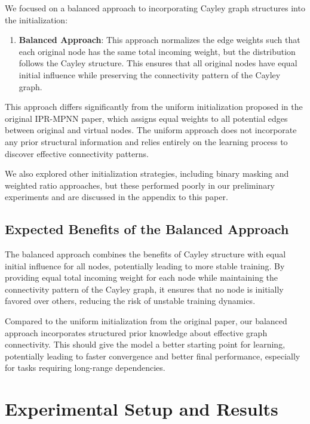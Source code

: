 \documentclass[11pt,a4paper]{article}
\begin{document}
We focused on a balanced approach to incorporating Cayley graph structures into the initialization:

\begin{enumerate}
    \item \textbf{Balanced Approach}: This approach normalizes the edge weights such that each original node has the same total incoming weight, but the distribution follows the Cayley structure. This ensures that all original nodes have equal initial influence while preserving the connectivity pattern of the Cayley graph.
\end{enumerate}

This approach differs significantly from the uniform initialization proposed in the original IPR-MPNN paper, which assigns equal weights to all potential edges between original and virtual nodes. The uniform approach does not incorporate any prior structural information and relies entirely on the learning process to discover effective connectivity patterns.

We also explored other initialization strategies, including binary masking and weighted ratio approaches, but these performed poorly in our preliminary experiments and are discussed in the appendix to this paper.

\subsection{Expected Benefits of the Balanced Approach}

The balanced approach combines the benefits of Cayley structure with equal initial influence for all nodes, potentially leading to more stable training. By providing equal total incoming weight for each node while maintaining the connectivity pattern of the Cayley graph, it ensures that no node is initially favored over others, reducing the risk of unstable training dynamics.

Compared to the uniform initialization from the original paper, our balanced approach incorporates structured prior knowledge about effective graph connectivity. This should give the model a better starting point for learning, potentially leading to faster convergence and better final performance, especially for tasks requiring long-range dependencies.

\section{Experimental Setup and Results}
\label{sec:experiments}
\end{document}

